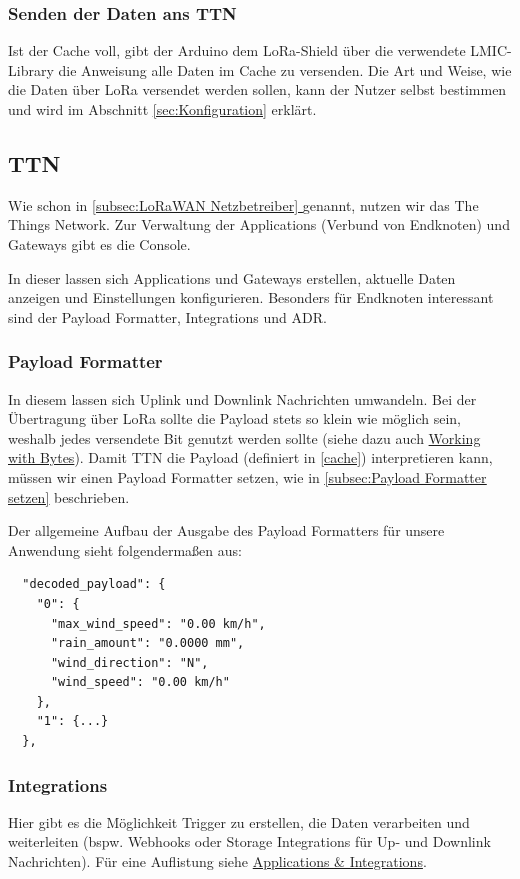 \documentclass[12pt]{article}
\newcommand*{\fullref}[1]{\hyperref[{#1}]{\ref{#1} \nameref{#1}}}   %
\begin{document}
      \subsubsection{Senden der Daten ans TTN}
      Ist der Cache voll, gibt der Arduino dem LoRa-Shield über die verwendete LMIC-Library die Anweisung alle Daten im Cache zu versenden.
      Die Art und Weise, wie die Daten über LoRa versendet werden sollen, kann der Nutzer selbst bestimmen und wird im Abschnitt \underline{\ref{sec:Konfiguration}} erklärt.


    \subsection{TTN}
      Wie schon in \underline{\fullref{subsec:LoRaWAN Netzbetreiber}} genannt, nutzen wir das The Things Network.
      Zur Verwaltung der Applications (Verbund von Endknoten) und Gateways gibt es die Console.

      In dieser lassen sich Applications und Gateways erstellen, aktuelle Daten anzeigen und Einstellungen konfigurieren.
      Besonders für Endknoten interessant sind der Payload Formatter, Integrations und ADR.


      \subsubsection{Payload Formatter}          
        In diesem lassen sich Uplink und Downlink Nachrichten umwandeln.
        Bei der Übertragung über LoRa sollte die Payload stets so klein wie möglich sein, weshalb jedes versendete Bit genutzt werden sollte
        (siehe dazu auch \href{https://www.thethingsnetwork.org/docs/devices/bytes/}{Working with Bytes}).
        Damit TTN die Payload (definiert in \underline{\ref{cache}}) interpretieren kann, müssen wir einen Payload Formatter setzen,
        wie in \underline{\ref{subsec:Payload Formatter setzen}} beschrieben.

        Der allgemeine Aufbau der Ausgabe des Payload Formatters für unsere Anwendung sieht folgendermaßen aus:

        \begin{lstlisting}
  "decoded_payload": {
    "0": {
      "max_wind_speed": "0.00 km/h",
      "rain_amount": "0.0000 mm",
      "wind_direction": "N",
      "wind_speed": "0.00 km/h"
    },
    "1": {...}
  },
        \end{lstlisting}

      \subsubsection{Integrations} \label{Integrations}
        Hier gibt es die Möglichkeit Trigger zu erstellen, die Daten verarbeiten und weiterleiten
        (bspw. Webhooks oder Storage Integrations für Up- und Downlink Nachrichten).
        Für eine Auflistung siehe \href{https://www.thethingsnetwork.org/docs/applications-and-integrations/}{Applications \& Integrations}.
\end{document}
